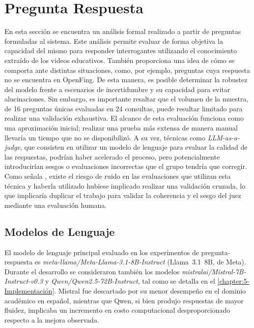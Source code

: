 \section{Pregunta Respuesta}
\label{section:6-Pregunta Respuesta}

En esta sección se encuentra un análisis formal realizado a partir de preguntas formuladas al sistema. Este análisis permite evaluar de forma objetiva la capacidad del mismo para responder interrogantes utilizando el conocimiento extraído de los videos educativos. También proporciona una idea de cómo se comporta ante distintas situaciones, como, por ejemplo, preguntas cuya respuesta no se encuentra en OpenFing. De esta manera, es posible determinar la robustez del modelo frente a escenarios de incertidumbre y su capacidad para evitar alucinaciones. 
Sin embargo, es importante resaltar que el volumen de la muestra, de 16 preguntas únicas evaluadas en 24 consultas, puede resultar limitado para realizar una validación exhaustiva. El alcance de esta evaluación funciona como una aproximación inicial; realizar una prueba más extensa de manera manual llevaría un tiempo que no se disponibilizó. A su vez, técnicas como \textit{LLM-as-a-judge}, que consisten en utilizar un modelo de lenguaje para evaluar la calidad de las respuestas, podrían haber acelerado el proceso, pero potencialmente introducirían sesgos o evaluaciones incorrectas que el grupo tendría que corregir. Como señala \cite{Chen2026Efficient}, existe el riesgo de ruido en las evaluaciones que utilizan esta técnica y haberla utilizado hubiese implicado realizar una validación cruzada, lo que implicaría duplicar el trabajo para validar la coherencia y el sesgo del juez mediante una evaluación humana.

\subsection{Modelos de Lenguaje}
\label{subsection:6-Modelos}

El modelo de lenguaje principal evaluado en los experimentos de pregunta-respuesta es \textit{meta-llama/Meta-Llama-3.1-8B-Instruct} (Llama~3.1~8B, de Meta). Durante el desarrollo se consideraron también los modelos \textit{mistralai/Mistral-7B-Instruct-v0.3} y \textit{Qwen/Qwen2.5-72B-Instruct}, tal como se detalla en el \autoref{chapter:5-Implementación}. Mistral fue descartado por su menor desempeño en el dominio académico en español, mientras que Qwen, si bien produjo respuestas de mayor fluidez, implicaba un incremento en costo computacional desproporcionado respecto a la mejora observada.

